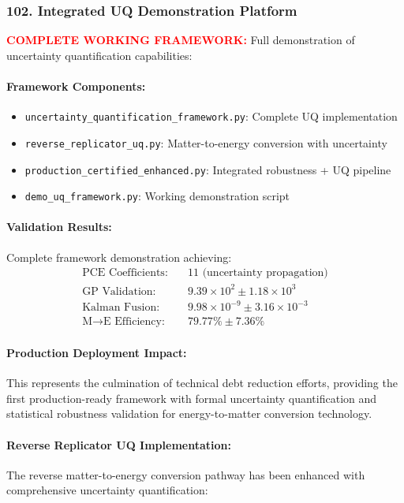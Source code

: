 \documentclass[11pt]{article}
\begin{document}
\subsubsection*{102. Integrated UQ Demonstration Platform}
\textcolor{red}{\textbf{COMPLETE WORKING FRAMEWORK:}} Full demonstration of uncertainty quantification capabilities:

\paragraph{Framework Components:}
\begin{itemize}
  \item \texttt{uncertainty\_quantification\_framework.py}: Complete UQ implementation
  \item \texttt{reverse\_replicator\_uq.py}: Matter-to-energy conversion with uncertainty
  \item \texttt{production\_certified\_enhanced.py}: Integrated robustness + UQ pipeline
  \item \texttt{demo\_uq\_framework.py}: Working demonstration script
\end{itemize}

\paragraph{Validation Results:}
Complete framework demonstration achieving:
\[
  \boxed{\begin{aligned}
    \text{PCE Coefficients:} &\quad 11 \text{ (uncertainty propagation)} \\
    \text{GP Validation:} &\quad 9.39 \times 10^2 \pm 1.18 \times 10^3 \\
    \text{Kalman Fusion:} &\quad 9.98 \times 10^{-9} \pm 3.16 \times 10^{-3} \\
    \text{M→E Efficiency:} &\quad 79.77\% \pm 7.36\%
  \end{aligned}}
\]

\paragraph{Production Deployment Impact:}
This represents the culmination of technical debt reduction efforts, providing the first production-ready framework with formal uncertainty quantification and statistical robustness validation for energy-to-matter conversion technology.

\paragraph{Reverse Replicator UQ Implementation:}
The reverse matter-to-energy conversion pathway has been enhanced with comprehensive uncertainty quantification:
\end{document}
